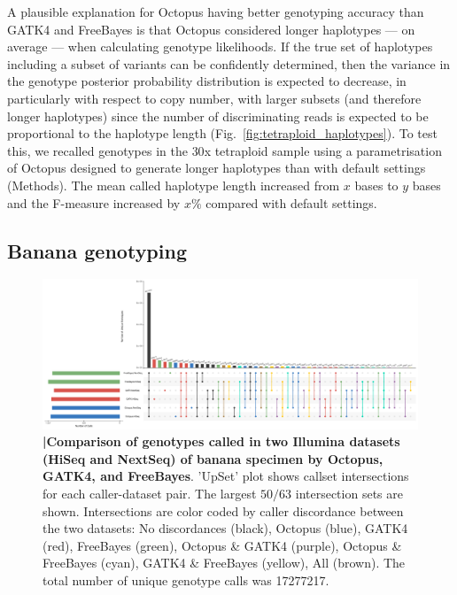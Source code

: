 \documentclass[notitlepage, twocolumn, 10pt]{article}
\begin{document}
A plausible explanation for Octopus having better genotyping accuracy than GATK4 and FreeBayes is that Octopus considered longer haplotypes --- on average --- when calculating genotype likelihoods. If the true set of haplotypes including a subset of variants can be confidently determined, then the variance in the genotype posterior probability distribution is expected to decrease, in particularly with respect to copy number, with larger subsets (and therefore longer haplotypes) since the number of discriminating reads is expected to be proportional to the haplotype length (Fig.\ \ref{fig:tetraploid_haplotypes}). To test this, we recalled genotypes in the $30$x tetraploid sample using a parametrisation of Octopus designed to generate longer haplotypes than with default settings (Methods). The mean called haplotype length increased from $x$ bases to $y$ bases and the F-measure increased by $x\%$ compared with default settings.


\subsection*{Banana genotyping}

\begin{figure}[tp]
	\centering
    \includegraphics[width=\textwidth,height=0.4\textwidth]{figures/banana_intersection}
    \caption{\textbf{|\:Comparison of genotypes called in two Illumina datasets (HiSeq and NextSeq) of banana specimen by Octopus, GATK4, and FreeBayes}. 'UpSet' plot shows callset intersections for each caller-dataset pair. The largest $50/63$ intersection sets are shown. Intersections are color coded by caller discordance between the two datasets: No discordances (black), Octopus (blue), GATK4 (red), FreeBayes (green), Octopus \& GATK4 (purple), Octopus \& FreeBayes (cyan), GATK4 \& FreeBayes (yellow), All (brown). The total number of unique genotype calls was \num[group-separator={,}]{17277217}.}
    \label{fig:banana_intersection}
\end{figure}
\end{document}
